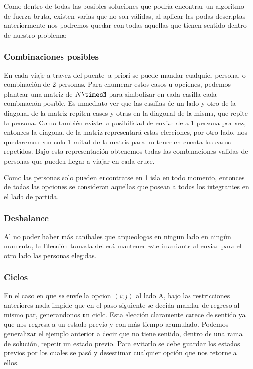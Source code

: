 Como dentro de todas las posibles soluciones que podría encontrar un algoritmo de fuerza bruta, existen varias que no son válidas, al aplicar las podas descriptas anteriormente nos podremos quedar con todas aquellas que tienen sentido dentro de nuestro problema:


\subsubsection*{Combinaciones posibles}
En cada viaje a travez del puente, a priori se puede mandar cualquier persona, o combinación de 2 personas. Para enumerar estos casos u opciones, podemos plantear una matriz de $N\timesN$ para simbolizar en cada casilla cada combinación posible. Es inmediato ver que las casillas de un lado y otro de la diagonal de la matriz repiten casos y otras en la diagonal de la misma, que repite la persona. Como también existe la posibilidad de enviar de a 1 persona por vez, entonces la diagonal de la matriz representará estas elecciones, por otro lado, nos quedaremos con solo 1 mitad de la matriz para no tener en cuenta los casos repetidos. Bajo esta representación obtenemos todas las combinaciones validas de personas que pueden llegar a viajar en cada cruce.

Como las personas solo pueden encontrarse en 1 isla en todo momento, entonces de todas las opciones se consideran aquellas que posean a todos los integrantes en el lado de partida.

\subsubsection*{Desbalance}
Al no poder haber más caníbales que arqueologos en ningun lado en ningún momento, la Elección tomada deberá mantener este invariante al enviar para el otro lado las personas elegidas.

\subsubsection*{Ciclos}
En el caso en que se envíe la opcion $(i; j)$ al lado A, bajo las restricciones anteriores nada impide que en el paso siguiente se decida mandar de regreso al mismo par, generandonos un ciclo. Esta elección claramente carece de sentido ya que nos regresa a un estado previo y con más tiempo acumulado. Podemos generalizar el ejemplo anterior a decir que no tiene sentido, dentro de una rama de solución, repetir un estado previo. Para evitarlo se debe guardar los estados previos por los cuales se pasó y desestimar cualquier opción que nos retorne a ellos.

